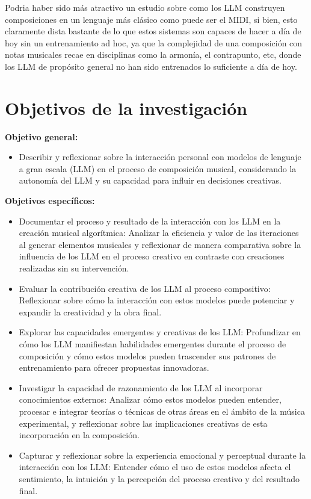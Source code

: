 Podria haber sido más atractivo un estudio sobre como los LLM construyen composiciones en un lenguaje más clásico como puede ser el MIDI, si bien, esto claramente dista bastante de lo que estos sistemas son capaces de hacer a día de hoy sin un entrenamiento ad hoc, ya que la complejidad de una composición con notas musicales recae en disciplinas como la armonía, el contrapunto, etc, donde los LLM de propósito general no han sido entrenados lo suficiente a día de hoy.

\section{Objetivos de la investigación}

\textbf{Objetivo general:}
\begin{itemize}
    \item Describir y reflexionar sobre la interacción personal con modelos de lenguaje a gran escala (LLM) en el proceso de composición musical, considerando la autonomía del LLM y su capacidad para influir en decisiones creativas.
\end{itemize}

\textbf{Objetivos específicos:}
\begin{itemize}
    \item Documentar el proceso y resultado de la interacción con los LLM en la creación musical algorítmica: Analizar la eficiencia y valor de las iteraciones al generar elementos musicales y reflexionar de manera comparativa sobre la influencia de los LLM en el proceso creativo en contraste con creaciones realizadas sin su intervención.
    \item Evaluar la contribución creativa de los LLM al proceso compositivo: Reflexionar sobre cómo la interacción con estos modelos puede potenciar y expandir la creatividad y la obra final.
    \item Explorar las capacidades emergentes y creativas de los LLM: Profundizar en cómo los LLM manifiestan habilidades emergentes durante el proceso de composición y cómo estos modelos pueden trascender sus patrones de entrenamiento para ofrecer propuestas innovadoras.
    \item Investigar la capacidad de razonamiento de los LLM al incorporar conocimientos externos: Analizar cómo estos modelos pueden entender, procesar e integrar teorías o técnicas de otras áreas en el ámbito de la música experimental, y reflexionar sobre las implicaciones creativas de esta incorporación en la composición.
    \item Capturar y reflexionar sobre la experiencia emocional y perceptual durante la interacción con los LLM: Entender cómo el uso de estos modelos afecta el sentimiento, la intuición y la percepción del proceso creativo y del resultado final.
\end{itemize}

